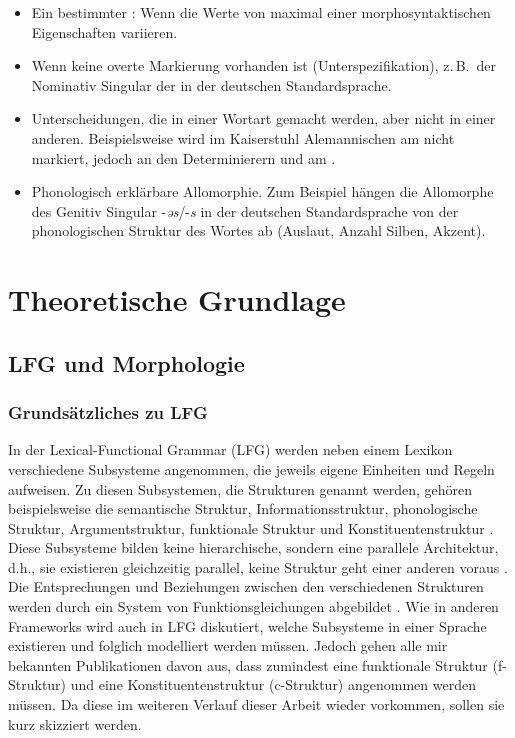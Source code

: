 \begin{itemize}
\item 
Ein bestimmter : Wenn die Werte von maximal einer morphosyntaktischen Eigenschaften variieren.
\item 
Wenn keine overte Markierung vorhanden ist (Unterspezifikation), z.\,B.\ der Nominativ Singular der  in der deutschen Standardsprache.
\item 
Unterscheidungen, die in einer Wortart gemacht werden, aber nicht in einer anderen. Beispielsweise wird im Kaiserstuhl Alemannischen  am  nicht markiert, jedoch an den Determinierern und am .
\item 
Phonologisch erklärbare Allomorphie. Zum Beispiel hängen die Allomorphe des Genitiv Singular  -\textit{əs}/-\textit{s} in der deutschen Standardsprache von der phonologischen Struktur des Wortes ab (Auslaut, Anzahl Silben, Akzent).
\end{itemize}

\section{Theoretische Grundlage}\label{4.1}

\subsection{LFG und Morphologie}\label{4.1.1}

\subsubsection{Grundsätzliches zu LFG} In der Lexical-Functional Grammar (LFG) werden neben einem Lexikon verschiedene Subsysteme angenommen, die jeweils eigene Einheiten und Regeln aufweisen. Zu diesen Subsystemen, die Strukturen genannt werden, gehören beispielsweise die semantische Struktur, Informationsstruktur, phonologische Struktur, Argumentstruktur, funktionale Struktur und Konstituentenstruktur \citep[22-25]{Falk2001}. Diese Subsysteme bilden keine hierarchische, sondern eine parallele Architektur, d.h., sie existieren gleichzeitig parallel, keine Struktur geht einer anderen voraus \citep[23]{Falk2001}. Die Entsprechungen und Beziehungen zwischen den verschiedenen Strukturen werden durch ein System von Funktionsgleichungen abgebildet \citep[51]{Bresnan2001}. Wie in anderen Frameworks wird auch in LFG diskutiert, welche Subsysteme in einer Sprache existieren und folglich modelliert werden müssen. Jedoch gehen alle mir bekannten Publikationen davon aus, dass zumindest eine funktionale Struktur (f-Struk\-tur) und eine Konstituentenstruktur (c-Struk\-tur) angenommen werden müssen. Da diese im weiteren Verlauf dieser Arbeit wieder vorkommen, sollen sie kurz skizziert werden.

